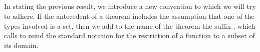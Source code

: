 \begin{code}
\AgdaSymbol{)}\AgdaSpace{}%
\AgdaFunction{,}\AgdaSpace{}%
\AgdaSymbol{(}\AgdaSpace{}%
\AgdaSpace{}%
\AgdaSpace{}%
\AgdaSpace{}%
\AgdaSpace{}%
\AgdaSpace{}%
\AgdaSpace{}%
\AgdaSymbol{)}\AgdaSpace{}%
\AgdaSpace{}%
\AgdaSymbol{)}\AgdaSpace{}%
\AgdaSpace{}%
\<%
\\
%
\>[2]\AgdaSpace{}%
\AgdaSymbol{=}\AgdaSpace{}%
\AgdaSpace{}%
\AgdaOperator{\AgdaInductiveConstructor{,}}\AgdaSpace{}%
\AgdaSpace{}%
\AgdaSymbol{(}\AgdaSpace{}%
\AgdaSymbol{)}\AgdaSpace{}%
\AgdaSpace{}%
\AgdaSymbol{(}\AgdaSpace{}%
\AgdaSpace{}%
\AgdaSpace{}%
\AgdaSpace{}%
\AgdaSpace{}%
\AgdaSpace{}%
\AgdaSpace{}%
\AgdaSymbol{)}\AgdaSpace{}%
\AgdaSpace{}%
\AgdaSymbol{)}\AgdaSpace{}%
\<%
\\
%
\\[\AgdaEmptyExtraSkip]%
%
\>[2]\AgdaSpace{}%
\AgdaSymbol{:}\AgdaSpace{}%
\AgdaSpace{}%
\AgdaOperator{\AgdaInductiveConstructor{,}}\AgdaSpace{}%
\AgdaSpace{}%
\AgdaSpace{}%
\AgdaSpace{}%
\AgdaOperator{\AgdaInductiveConstructor{,}}\AgdaSpace{}%
\<%
\\
%
\>[2]\AgdaSpace{}%
\AgdaSymbol{=}\AgdaSpace{}%
\AgdaSpace{}%
\<%
\end{code}
\ccpad
In stating the previous result, we introduce a new convention to which we will try to adhere. If the antecedent of a theorem includes the assumption that one of the types involved is a set, then we add to the name of the theorem the suffix , which calls to mind the standard notation for the restriction of a function to a subset of its domain.

